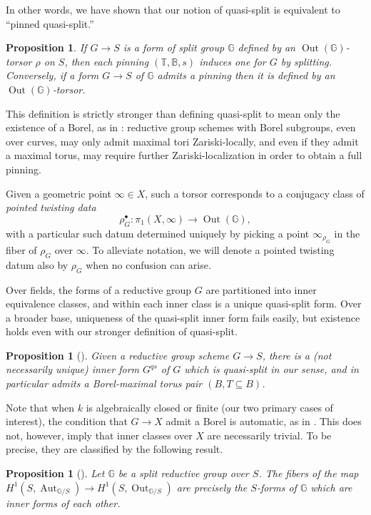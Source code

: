 \documentclass[openany]{amsbook}
\newtheorem{proposition}[theorem]{Proposition}
\theoremstyle{definition}
\theoremstyle{remark}
\numberwithin{equation}{section}
\newcommand{\G}{\mathbb{G}}
\newcommand{\B}{\mathbb{B}}
\newcommand{\T}{\mathbb{T}}
\renewcommand{\-}{\operatorname{-}}
\newcommand{\Aut}{\operatorname{Aut}}
\newcommand{\Out}{\operatorname{Out}}
\begin{document}
In other words, we have shown that our notion of quasi-split is equivalent to ``pinned quasi-split.''
\begin{proposition}
    If $G \to S$ is a form of split group $\G$ defined by an $\Out(\G)$-torsor $\rho$ on $S$, then each pinning $(\T, \B, s)$ induces one for $G$ by splitting. Conversely, if a form $G \to S$ of $\G$ admits a pinning then it is defined by an $\Out(\G)$-torsor.
\end{proposition}

This definition is strictly stronger than defining quasi-split to mean only the existence of a Borel, as in \cite{conradrgs}: reductive group schemes with Borel subgroups, even over curves, may only admit maximal tori Zariski-locally, and even if they admit a maximal torus, may require further Zariski-localization in order to obtain a full pinning. 

Given a geometric point $\infty \in X$, such a torsor corresponds to a conjugacy class of \emph{pointed twisting data}
$$
    \rho_{G}^\bullet : \pi_1(X, \infty) \to \Out(\G),
$$
with a particular such datum determined uniquely by picking a point $\infty_{\rho_G}$ in the fiber of $\rho_G$ over $\infty$. To alleviate notation, we will denote a pointed twisting datum also by $\rho_G$ when no confusion can arise.  

Over fields, the forms of a reductive group $G$ are partitioned into inner equivalence classes, and within each inner class is a unique quasi-split form. Over a broader base, uniqueness of the quasi-split inner form fails easily, but existence holds even with our stronger definition of quasi-split. 

\begin{proposition}[{{\cite[Prop. 7.2.11]{conradrgs}}}]
    Given a reductive group scheme $G \to S$, there is a (not necessarily unique) inner form $G^{qs}$ of $G$ which is quasi-split in our sense, and in particular admits a Borel-maximal torus pair $(B, T \subseteq B)$. 
\end{proposition}

Note that when $k$ is algebraically closed or finite (our two primary cases of interest), the condition that $G \to X$ admit a Borel is automatic, as in \cite[Prop. 2.13]{PappasRapoportGBundles}. This does not, however, imply that inner classes over $X$ are necessarily trivial. To be precise, they are classified by the following result.

\begin{proposition}[{{\cite[Prop. 7.2.2, Ex. 7.3.8]{conradrgs}}}]
    Let $\G$ be a split reductive group over $S$. The fibers of the map $H^1(S, \Aut_{\G/S}) \to H^1(S, \Out_{\G/S})$ are precisely the $S$-forms of $\G$ which are inner forms of each other.
\end{proposition}
\end{document}
